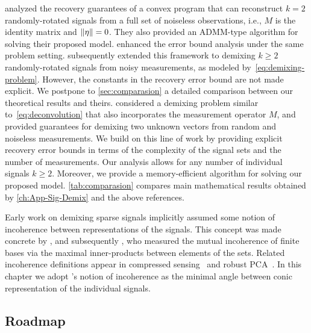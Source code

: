 \citet{mccoy2014convexity} analyzed the recovery guarantees of a convex program that can reconstruct $k = 2$ randomly-rotated signals from a full set of noiseless observations, i.e., $M$ is the identity matrix and $\|\eta\|=0$. They also provided an ADMM-type algorithm for solving their proposed model. \citet{mccoy2014sharp} enhanced the error bound analysis under the same problem setting. \citet{mccoy2013achievable} subsequently extended this framework to demixing $k \geq 2$ randomly-rotated signals from noisy measurements, as modeled by~\eqref{eq:demixing-problem}. However, the constants in the recovery error bound are not made explicit. We postpone to \autoref{sec:comparasion} a detailed comparison between our theoretical results and theirs. \citet{oymak2017universality} considered a demixing problem similar to~\eqref{eq:deconvolution} that also incorporates the measurement operator $M$, and provided guarantees for demixing two unknown vectors from random and noiseless measurements. We build on this line of work by providing explicit recovery error bounds in terms of the complexity of the signal sets and the number of measurements. Our analysis allows for any number of individual signals $k\ge2$. Moreover, we provide a memory-efficient algorithm for solving our proposed model. \autoref{tab:comparasion} compares main mathematical results obtained by \autoref{ch:App-Sig-Demix} and the above references.

Early work on demixing sparse signals implicitly assumed some notion of incoherence between representations of the signals. This concept was made concrete by \citet{doh01}, and subsequently \citet{doe03}, who measured the mutual incoherence of finite bases via the maximal inner-products between elements of the sets. Related incoherence definitions appear in compressed sensing~\citep{tro04, maleki2009coherence} and robust PCA~\citep{candes2011robust, wright2013compressive}. In this chapter we adopt \citet{mccoy2013achievable}'s notion of incoherence as the minimal angle between conic representation of the individual signals.

\subsection{Roadmap}

